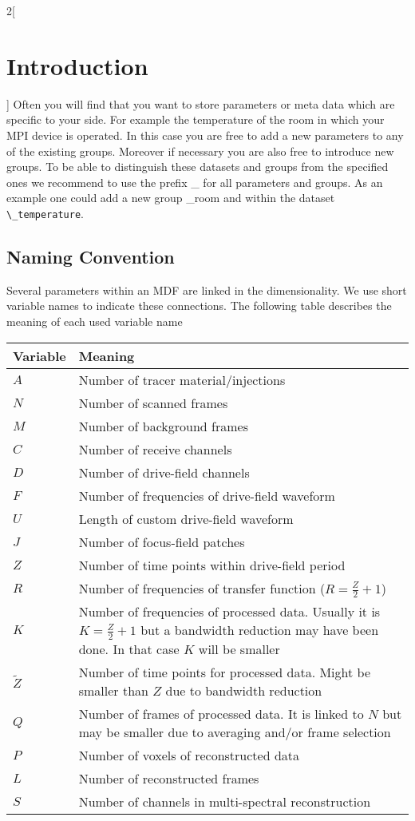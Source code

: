 \documentclass[landscape,a4paper]{article} %
\newcommand{\inl}[1]{\lstinline[columns=fixed]{#1}}
\newcommand{\inlvar}[1]{{\ttfamily#1}}
\begin{document}
\begin{multicols}{2}[\section{Introduction} \label{Sec:Introduction}]
Often you will find that you want to store parameters or meta data which are specific to your side. For example the temperature of the room in which your MPI device is operated. In this case you are free to add a new parameters to any of the existing groups. Moreover if necessary you are also free to introduce new groups. To be able to distinguish these datasets and groups from the specified ones we recommend to use the prefix \inlvar{\_} for all parameters and groups. As an example one could add a new group \inlvar{\_room} and within the dataset \inl{\_temperature}.

\subsection{Naming Convention}

Several parameters within an MDF are linked in the dimensionality. We use short variable names to indicate these connections. The following table describes the meaning of each used variable name

\noindent \begin{tabularx}{\columnwidth}{lX} 
\textbf{Variable} & \textbf{Meaning}  \\ \hline 
$A$ &  Number of tracer material/injections \\ \hline
$N$ &  Number of scanned frames \\ \hline
$M$ &  Number of background frames \\ \hline
$C$ &  Number of receive channels \\ \hline
$D$ &  Number of drive-field channels \\ \hline
$F$ &  Number of frequencies of drive-field waveform \\ \hline
$U$ &  Length of custom drive-field waveform\\ \hline
$J$ &  Number of focus-field patches\\ \hline
$Z$ &  Number of time points within drive-field period\\ \hline
$R$ &  Number of frequencies of transfer function ($R=\frac{Z}{2}+1$)\\ \hline
$K$ &  Number of frequencies of processed data. Usually it is $K=\frac{Z}{2}+1$ but a bandwidth reduction may have been done. In that case $K$ will be smaller\\ \hline
$\tilde{Z}$ &  Number of time points for processed data. Might be smaller than $Z$ due to bandwidth reduction\\ \hline
$Q$ &  Number of frames of processed data. It is linked to $N$ but may be smaller due to averaging and/or frame selection\\ \hline
$P$ &  Number of voxels of reconstructed data\\ \hline
$L$ &  Number of reconstructed frames\\ \hline
$S$ &  Number of channels in multi-spectral reconstruction\\ \hline


\end{tabularx}
\end{multicols}
\end{document}
